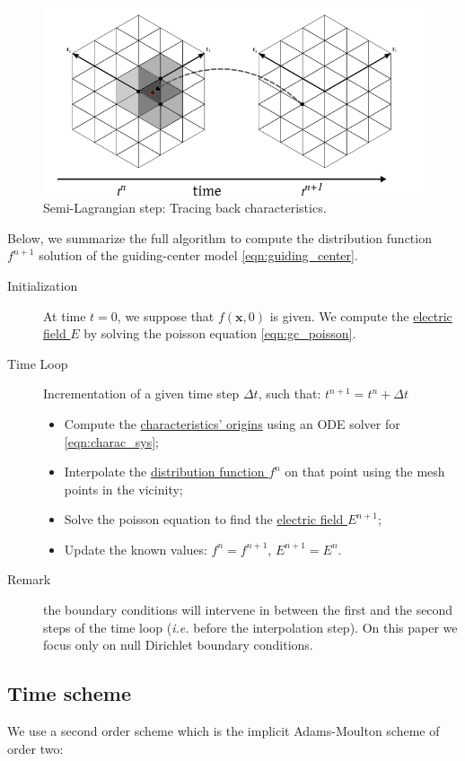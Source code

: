 \documentclass[proc]{edpsmath}
\begin{document}
\begin{figure}[h!]
	\label{fig:SL}
	\centering
	\includegraphics[scale=0.5]{figures/SL_hex.png} 
	\caption{Semi-Lagrangian step: Tracing back characteristics.}
\end{figure}

Below, we summarize the full algorithm to compute the distribution function $f^{n+1}$ solution of the guiding-center model \eqref{eqn:guiding_center}.

\begin{description}
	\item[Initialization] At time $t=0$, we suppose that $f(\mathbf{x}, 0)$ is given. We compute the \underline{electric field $E$} by solving the poisson equation \eqref{eqn:gc_poisson}.
	\item[Time Loop] Incrementation of a given time step $\Delta t$, such that: $t^{n+1} = t^n + \Delta t$
		\begin{itemize}
		\item Compute the \underline{characteristics' origins} using an ODE solver for \eqref{eqn:charac_sys};
		\item Interpolate the \underline{distribution function $f^n$} on that point using the mesh points in the vicinity;
		\item Solve the poisson equation to find the \underline{electric field $E^{n+1}$};
		\item Update the known values: $f^n = f^{n+1}$, $E^{n+1}=E^n$.
		\end{itemize}
	\item[Remark] the boundary conditions will intervene in between the first and the second steps of the time loop (\emph{i.e.} before the interpolation step). On this paper we focus only on null Dirichlet boundary conditions.
\end{description}


\subsection{Time scheme}
We use a second order scheme which is the implicit Adams-Moulton scheme of order two: 
\end{document}
